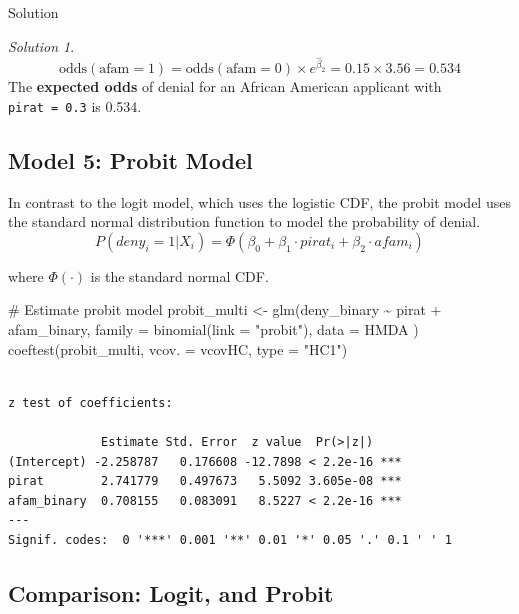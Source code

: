 \documentclass[
  12pt,
  letterpaper,
]{scrbook}
\newenvironment{Shaded}{\begin{snugshade}}{\end{snugshade}}
\newcommand{\AttributeTok}[1]{\textcolor[rgb]{0.40,0.45,0.13}{#1}}
\newcommand{\CommentTok}[1]{\textcolor[rgb]{0.37,0.37,0.37}{#1}}
\newcommand{\FunctionTok}[1]{\textcolor[rgb]{0.28,0.35,0.67}{#1}}
\newcommand{\NormalTok}[1]{\textcolor[rgb]{0.00,0.23,0.31}{#1}}
\newcommand{\OtherTok}[1]{\textcolor[rgb]{0.00,0.23,0.31}{#1}}
\newcommand{\SpecialCharTok}[1]{\textcolor[rgb]{0.37,0.37,0.37}{#1}}
\newcommand{\StringTok}[1]{\textcolor[rgb]{0.13,0.47,0.30}{#1}}
\theoremstyle{plain}
\theoremstyle{definition}
\theoremstyle{remark}
\newtheorem{refsolution}{Solution}[chapter]
\begin{document}
Solution

\begin{refsolution}
\[
\text{odds}(\text{afam}=1) = \text{odds}(\text{afam}=0) \times e^{\hat{\beta}_2} = 0.15 \times 3.56 = 0.534
\] The \textbf{expected odds} of denial for an African American
applicant with \texttt{pirat\ =\ 0.3} is 0.534.

\label{sol-2}

\end{refsolution}

\subsection{Model 5: Probit Model}\label{model-5-probit-model}

In contrast to the logit model, which uses the logistic CDF, the probit
model uses the {standard normal} distribution function to model the
probability of denial. \[
P(deny_i = 1 | X_i) = \Phi(\beta_0 + \beta_1 \cdot pirat_i + \beta_2 \cdot afam_i)
\]

where \(\Phi(\cdot)\) is the standard normal CDF.

\begin{Shaded}
\begin{Highlighting}[]
\CommentTok{\# Estimate probit model}
\NormalTok{probit\_multi }\OtherTok{\textless{}{-}} \FunctionTok{glm}\NormalTok{(deny\_binary }\SpecialCharTok{\textasciitilde{}}\NormalTok{ pirat }\SpecialCharTok{+}\NormalTok{ afam\_binary,}
    \AttributeTok{family =} \FunctionTok{binomial}\NormalTok{(}\AttributeTok{link =} \StringTok{"probit"}\NormalTok{),}
    \AttributeTok{data =}\NormalTok{ HMDA}
\NormalTok{)}
\FunctionTok{coeftest}\NormalTok{(probit\_multi, }\AttributeTok{vcov. =}\NormalTok{ vcovHC, }\AttributeTok{type =} \StringTok{"HC1"}\NormalTok{)}
\end{Highlighting}
\end{Shaded}

\begin{verbatim}

z test of coefficients:

             Estimate Std. Error  z value  Pr(>|z|)    
(Intercept) -2.258787   0.176608 -12.7898 < 2.2e-16 ***
pirat        2.741779   0.497673   5.5092 3.605e-08 ***
afam_binary  0.708155   0.083091   8.5227 < 2.2e-16 ***
---
Signif. codes:  0 '***' 0.001 '**' 0.01 '*' 0.05 '.' 0.1 ' ' 1
\end{verbatim}

\subsection{Comparison: Logit, and
Probit}\label{comparison-logit-and-probit}
\end{document}

